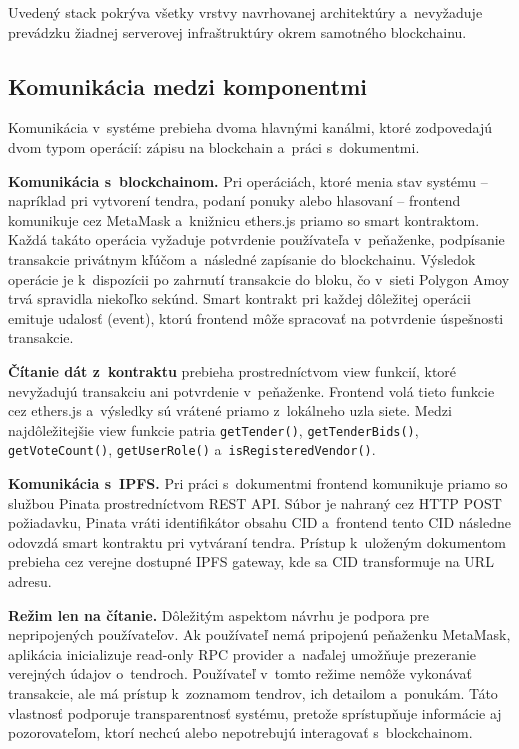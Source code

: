 Uvedený stack pokrýva všetky vrstvy navrhovanej architektúry a~nevyžaduje
prevádzku žiadnej serverovej infraštruktúry okrem samotného blockchainu.

\subsection{Komunikácia medzi komponentmi}
\label{subsec:component_communication}

Komunikácia v~systéme prebieha dvoma hlavnými kanálmi, ktoré zodpovedajú
dvom typom operácií: zápisu na blockchain a~práci s~dokumentmi.

\textbf{Komunikácia s~blockchainom.} Pri operáciách, ktoré menia stav systému
-- napríklad pri vytvorení tendra, podaní ponuky alebo hlasovaní -- frontend
komunikuje cez MetaMask a~knižnicu ethers.js priamo so smart kontraktom. Každá
takáto operácia vyžaduje potvrdenie používateľa v~peňaženke, podpísanie
transakcie privátnym kľúčom a~následné zapísanie do blockchainu. Výsledok
operácie je k~dispozícii po zahrnutí transakcie do bloku, čo v~sieti Polygon
Amoy trvá spravidla niekoľko sekúnd. Smart kontrakt pri každej dôležitej
operácii emituje udalosť (event), ktorú frontend môže spracovať na potvrdenie
úspešnosti transakcie.

\textbf{Čítanie dát z~kontraktu} prebieha prostredníctvom view funkcií, ktoré
nevyžadujú transakciu ani potvrdenie v~peňaženke. Frontend volá tieto funkcie
cez ethers.js a~výsledky sú vrátené priamo z~lokálneho uzla siete. Medzi
najdôležitejšie view funkcie patria \texttt{getTender()},
\texttt{getTenderBids()}, \texttt{getVoteCount()}, \texttt{getUserRole()}
a~\texttt{isRegisteredVendor()}.

\textbf{Komunikácia s~IPFS.} Pri práci s~dokumentmi frontend komunikuje priamo
so službou Pinata prostredníctvom REST API. Súbor je nahraný cez HTTP POST
požiadavku, Pinata vráti identifikátor obsahu CID a~frontend tento CID
následne odovzdá smart kontraktu pri vytváraní tendra. Prístup k~uloženým
dokumentom prebieha cez verejne dostupné IPFS gateway, kde sa CID transformuje
na URL adresu.

\textbf{Režim len na čítanie.} Dôležitým aspektom návrhu je podpora pre
nepripojených používateľov. Ak používateľ nemá pripojenú peňaženku MetaMask,
aplikácia inicializuje read-only RPC provider a~naďalej umožňuje prezeranie
verejných údajov o~tendroch. Používateľ v~tomto režime nemôže vykonávať
transakcie, ale má prístup k~zoznamom tendrov, ich detailom a~ponukám. Táto
vlastnosť podporuje transparentnosť systému, pretože sprístupňuje informácie
aj pozorovateľom, ktorí nechcú alebo nepotrebujú interagovať s~blockchainom.

